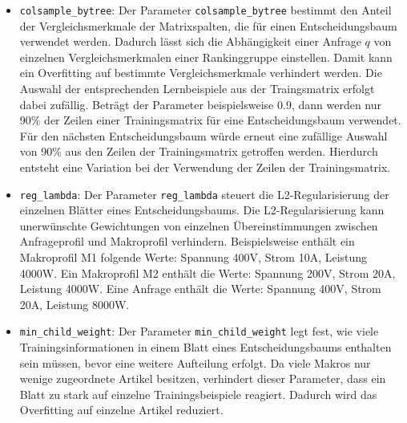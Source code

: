 \begin{itemize}
\item \texttt{colsample\_bytree}: Der Parameter \texttt{colsample\_bytree} bestimmt den Anteil der Vergleichsmerkmale der Matrixspalten, die für einen Entscheidungsbaum verwendet werden. 
Dadurch lässt sich die Abhängigkeit einer Anfrage \(q\) von einzelnen Vergleichsmerkmalen einer Rankinggruppe einstellen. Damit kann ein Overfitting auf bestimmte Vergleichsmerkmale verhindert werden.
Die Auswahl der entsprechenden Lernbeispiele aus der Traingsmatrix erfolgt dabei zufällig. Beträgt der Parameter beispielsweise 0.9, dann werden nur 90\% der Zeilen einer Trainingsmatrix für eine Entscheidungsbaum verwendet.
Für den nächsten Entscheidungsbaum würde erneut eine zufällige Auswahl von 90\% aus den Zeilen der Trainingsmatrix getroffen werden. Hierdurch entsteht eine Variation bei der Verwendung der Zeilen der Trainingsmatrix.


\item \texttt{reg\_lambda}: Der Parameter \texttt{reg\_lambda} steuert die L2-Regularisierung der einzelnen Blätter eines Entscheidungsbaums.
Die L2-Regularisierung kann unerwünschte Gewichtungen von einzelnen Übereinstimmungen zwischen Anfrageprofil und Makroprofil verhindern.
Beispielsweise enthält ein Makroprofil M1 folgende Werte: Spannung 400V, Strom 10A, Leistung 4000W. Ein Makroprofil M2 enthält die Werte: Spannung 200V, Strom 20A, Leistung 4000W. 
Eine Anfrage enthält die Werte: Spannung 400V, Strom 20A, Leistung 8000W. 


\item \texttt{min\_child\_weight}: Der Parameter \texttt{min\_child\_weight} legt fest, wie viele Trainingsinformationen in einem Blatt eines Entscheidungsbaums enthalten sein müssen, bevor eine weitere Aufteilung erfolgt.
Da viele Makros nur wenige zugeordnete Artikel besitzen, verhindert dieser Parameter, dass ein Blatt zu stark auf einzelne Trainingsbeispiele reagiert. Dadurch wird das Overfitting auf einzelne Artikel reduziert.


\end{itemize}
